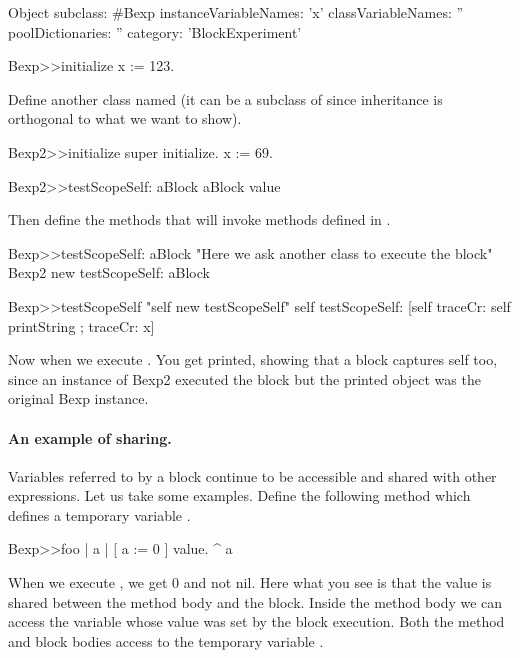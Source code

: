 \documentclass[a4paper,10pt,twoside]{book}
\begin{document}
\begin{code}{}
Object subclass: #Bexp
	instanceVariableNames: 'x'
	classVariableNames: ''
	poolDictionaries: ''
	category: 'BlockExperiment'
\end{code}

\begin{code}{}
Bexp>>initialize
	x := 123.
\end{code}	

Define another class named  (it can be a subclass of  since inheritance is orthogonal to what we want to show).


\begin{code}{}
Bexp2>>initialize
	super initialize.
	x := 69.

Bexp2>>testScopeSelf: aBlock
	aBlock value
\end{code}

Then define the methods that will invoke  methods defined in .
\begin{code}{}	
Bexp>>testScopeSelf: aBlock
	"Here we ask another class to execute the block"
	Bexp2 new testScopeSelf: aBlock
	
Bexp>>testScopeSelf
	"self new testScopeSelf"
	self testScopeSelf: [self traceCr: self printString ; traceCr: x]
\end{code}	

Now when we execute . You get  printed, showing that a block captures self too, since an instance of Bexp2 executed the block but the printed object was the original Bexp instance. 

\paragraph{An example of sharing.}

Variables referred to by a block continue to be accessible and shared with other expressions. Let us  take some examples. Define the following method  which defines a temporary variable .

\begin{code}{}
Bexp>>foo
	| a |
	[ a := 0 ] value.
	^ a
\end{code}

When we execute , we get 0 and not nil. 
Here what you see is that the value is shared between the method body and the block. Inside the method body we can access the variable whose value was set by the block execution. 
Both the method  and block bodies access to the temporary variable .
\end{document}
